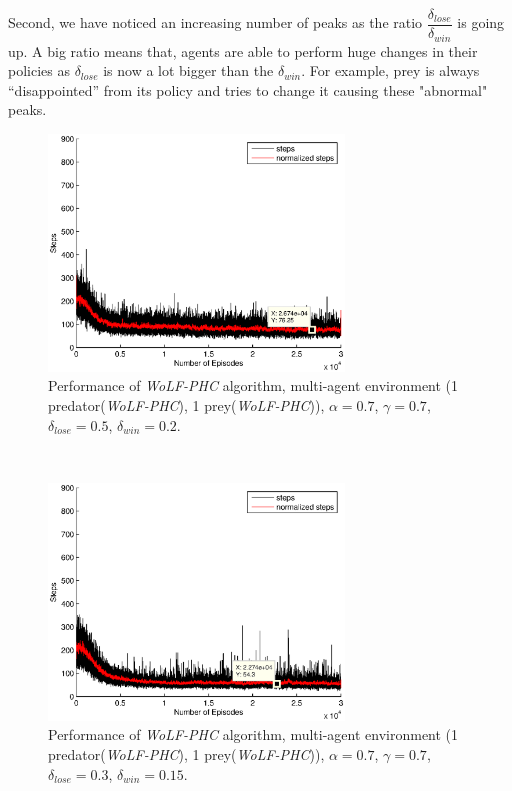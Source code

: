\documentclass[a4paper,11pt]{article}
\begin{document}
Second, we have noticed an increasing number of peaks as the ratio $\dfrac{\delta_{lose}}{\delta_{win}}$ is going up. A big ratio means that, agents are able to perform huge changes in their policies as $\delta_{lose}$ is now a lot bigger than the $\delta_{win}$. For example, prey is always ``disappointed'' from its policy and tries to change it causing these "abnormal" peaks.

\begin{figure}[ht!]
  \centering
    \includegraphics[width=0.7\textwidth]{figures/w07070502.eps}
    \caption{Performance of  \textit{WoLF-PHC} algorithm, multi-agent environment (1 predator(\textit{WoLF-PHC}), 1 prey(\textit{WoLF-PHC})), $\alpha = 0.7$, $\gamma = 0.7$, $\delta_{lose} = 0.5$, $\delta_{win} = 0.2$.}
    \label{w111}
\end{figure}
~
\begin{figure}[ht!]
  \centering
    \includegraphics[width=0.7\textwidth]{figures/w070703015.eps}
       \caption{Performance of  \textit{WoLF-PHC} algorithm, multi-agent environment (1 predator(\textit{WoLF-PHC}), 1 prey(\textit{WoLF-PHC})), $\alpha = 0.7$, $\gamma = 0.7$, $\delta_{lose} = 0.3$, $\delta_{win} = 0.15$.}
    \label{w112}
\end{figure}
\end{document}
